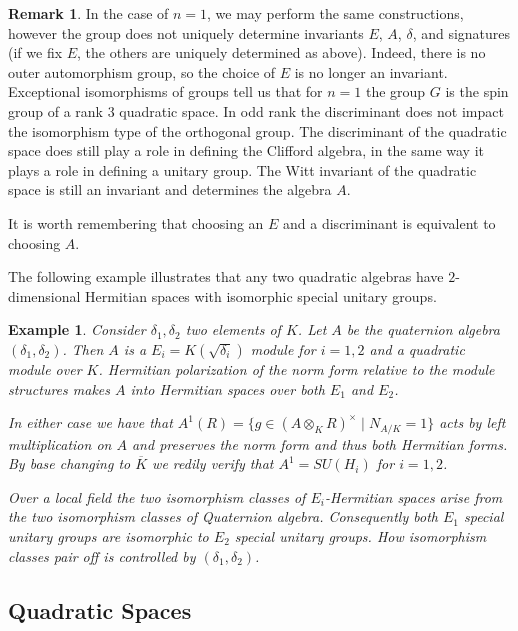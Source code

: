 \documentclass{article}
\theoremstyle{plain}
\newtheorem{example}[theorem]{Example}
\theoremstyle{definition}
\newtheorem{remark}[theorem]{Remark}
\numberwithin{equation}{section}
\begin{document}
\begin{remark}
In the case of $n=1$, we may perform the same constructions, however the group does not uniquely determine invariants $E$, $A$, $\delta$, and signatures (if we fix $E$, the others are uniquely determined as above).
Indeed, there is no outer automorphism group, so the choice of $E$ is no longer an invariant.
Exceptional isomorphisms of groups tell us that for $n=1$ the group $G$ is the spin group of a rank $3$ quadratic space.
In odd rank the discriminant does not impact the isomorphism type of the orthogonal group.
The discriminant of the quadratic space does still play a role in defining the Clifford algebra, in the same way it plays a role in defining a unitary group. The Witt invariant of the quadratic space is still an invariant and determines the algebra $A$.

It is worth remembering that choosing an $E$ and a discriminant is equivalent to choosing $A$.

The following example illustrates that any two quadratic algebras have $2$-dimensional Hermitian spaces with isomorphic special unitary groups.
\begin{example}
Consider $\delta_1,\delta_2$ two elements of $K$.
Let $A$ be the quaternion algebra $(\delta_1,\delta_2)$.
Then $A$ is a $E_i=K(\sqrt{\delta_i})$ module for $i=1,2$ and a quadratic module over $K$.
Hermitian  polarization of the norm form relative to the module structures makes $A$ into Hermitian spaces over both $E_1$ and $E_2$.

In either case we have that $A^1(R) = \{ g\in (A\otimes_K R)^\times \mid N_{A/K} = 1 \}$ acts by left multiplication on $A$ and preserves the norm form and thus both Hermitian forms. By base changing to $\overline{K}$ we redily verify that $A^1 = SU(H_i)$ for $i=1,2$.

Over a local field the two isomorphism classes of $E_i$-Hermitian spaces arise from the two isomorphism classes of Quaternion algebra.
Consequently both $E_1$ special unitary groups are isomorphic to $E_2$ special unitary groups.
How isomorphism classes pair off is controlled by $(\delta_1,\delta_2)$.
\end{example}
\end{remark}




\subsection{Quadratic Spaces}
 
\end{document}
